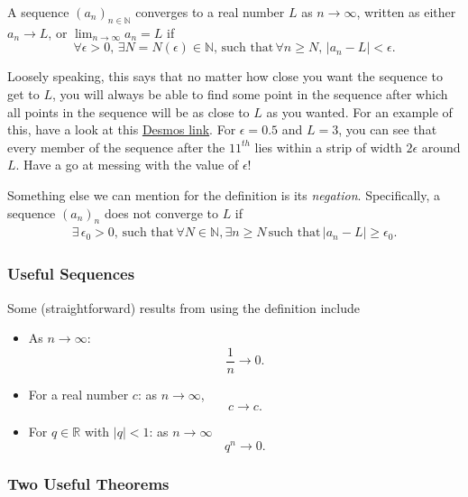\documentclass[
  12pt,
  a4paper]{extarticle}
\providecommand{\tightlist}{%
  \setlength{\itemsep}{0pt}\setlength{\parskip}{0pt}}
\theoremstyle{plain}
\theoremstyle{definition}
\theoremstyle{plain}
\theoremstyle{plain}
\theoremstyle{plain}
\theoremstyle{plain}
\theoremstyle{definition}
\theoremstyle{definition}
\theoremstyle{remark}
\theoremstyle{remark}
\let\BeginKnitrBlock\begin \let\EndKnitrBlock\end
\renewcommand{\;}{\,}
\begin{document}
\BeginKnitrBlock{definition}[Sequence Convergence]
{\label{def:def2} }A sequence \((a_n)_{n\in\mathbb{N}}\) converges to a real number \(L\) as \(n \longrightarrow \infty\), written as either \(a_n \longrightarrow L\), or \(\lim_{n \to \infty}a_n = L\) if \[\forall \epsilon > 0, \; \exists N = N(\epsilon) \in \mathbb{N}, \; \text{such that} \; \forall n \geq N, \; \lvert a_n - L \rvert < \epsilon.\]
\EndKnitrBlock{definition}
Loosely speaking, this says that no matter how close you want the sequence to get to \(L\), you will always be able to find some point in the sequence after which all points in the sequence will be as close to \(L\) as you wanted. For an example of this, have a look at this \href{https://www.desmos.com/calculator/dfkjgg0wzj}{Desmos link}. For \(\epsilon = 0.5\) and \(L = 3\), you can see that every member of the sequence after the \(11^{th}\) lies within a strip of width \(2\epsilon\) around \(L\). Have a go at messing with the value of \(\epsilon\)!

Something else we can mention for the definition is its \emph{negation}. Specifically, a sequence \((a_n)_n\) does not converge to \(L\) if
\begin{align*}
    \exists\; \epsilon_0 > 0, \; \text{such that} \; \forall N \in \mathbb{N}, \exists n \geq N \; \text{such that} \; \lvert a_n - L \rvert \geq \epsilon_0.
\end{align*}

\hypertarget{useful-sequences}{%
\subsubsection{Useful Sequences}\label{useful-sequences}}

Some (straightforward) results from using the definition include

\begin{itemize}
\tightlist
\item
  As \(n \longrightarrow \infty\): \[\frac{1}{n} \longrightarrow 0.\]
\item
  For a real number \(c\): as \(n \longrightarrow \infty\), \[c \longrightarrow c.\]
\item
  For \(q \in \mathbb{R}\) with \(\lvert q \rvert < 1\): as \(n \longrightarrow \infty\) \[q^n \longrightarrow 0.\]
\end{itemize}

\hypertarget{two-useful-theorems}{%
\subsubsection{Two Useful Theorems}\label{two-useful-theorems}}
\end{document}
